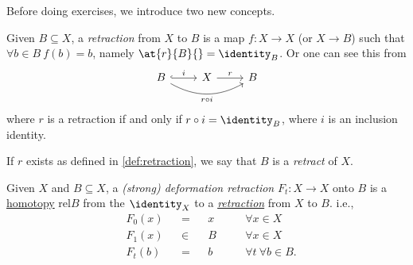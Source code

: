 Before doing exercises, we introduce two new concepts.
\begin{definition}\label{def:retraction}
	Given \(B\subseteq X\), a \emph{retraction} from \(X\) to \(B\) is a map \(f\colon X\to X\) (or \(X\to B\))
	such that \(\forall b\in B\ f(b) = b\), namely \(\at{r}{B}{} = \identity_B\). Or one can see this from
	\[
		\begin{tikzcd}
			B \ar[rr, swap, bend right=30, "r \circ i"] \ar[r,hook,"i"] & X \ar[r, "r"] & B
		\end{tikzcd}
	\]
	where \(r\) is a retraction if and only if \(r\circ i = \identity_B\), where \(i\) is an inclusion identity.
\end{definition}

\begin{definition}[Retract]\label{def:retract}
	If \(r\) exists as defined in \autoref{def:retraction}, we say that \(B\) is a \emph{retract} of \(X\).
\end{definition}

\begin{definition}\label{def:deformation-retraction}
	Given \(X\) and \(B\subseteq X\), a \emph{(strong) deformation retraction} \(F_t\colon X\to X\) onto \(B\) is
	a \hyperref[def:homotopy]{homotopy} \(\mathrm{rel} B\) from the \(\identity_X\) to a \hyperref[def:retraction]{\emph{retraction}}
	from \(X\) to \(B\). i.e.,
	\[
		\begin{alignedat}{4}
			&F_0(x) &&= &&x\quad &&\forall x\in X\\
			&F_1(x) &&\in &&B\quad &&\forall x\in X\\
			&F_t(b) &&= &&b\quad &&\forall t\ \forall b\in B.
		\end{alignedat}
	\]
\end{definition}

